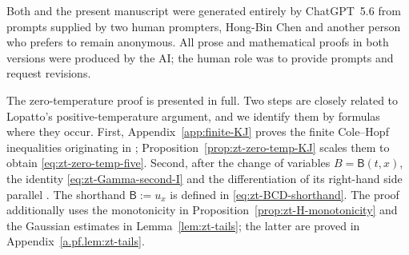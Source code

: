 \documentclass[10pt]{amsart}
\theoremstyle{definition}
\theoremstyle{remark}
\numberwithin{equation}{section}
\newcommand{\1}{\mathbf 1}
\begin{document}
Both \cite{AIxivPreprint} and the present manuscript were generated entirely by ChatGPT~5.6 from prompts supplied by two human prompters, Hong-Bin Chen and another person who prefers to remain anonymous. All prose and mathematical proofs in both versions were produced by the AI; the human role was to provide prompts and request revisions.

The zero-temperature proof is presented in full. Two steps are closely related to Lopatto's positive-temperature argument, and we identify them by formulas where they occur. First, Appendix~\ref{app:finite-KJ} proves the finite Cole--Hopf inequalities originating in \cite[Proposition 3.6 and Equation (3.39)]{Lopatto2026}; Proposition~\ref{prop:zt-zero-temp-KJ} scales them to obtain \eqref{eq:zt-zero-temp-five}. Second, after the change of variables $B=\mathsf B(t,x)$, the identity \eqref{eq:zt-Gamma-second-I} and the differentiation of its right-hand side parallel \cite[Proposition 9.1]{Lopatto2026}. The shorthand $\mathsf B:=u_x$ is defined in \eqref{eq:zt-BCD-shorthand}. The proof additionally uses the monotonicity in Proposition~\ref{prop:zt-H-monotonicity} and the Gaussian estimates in Lemma~\ref{lem:zt-tails}; the latter are proved in Appendix~\ref{a.pf.lem:zt-tails}.
\end{document}
